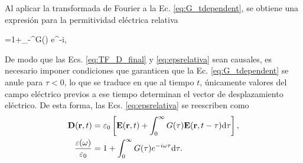 Al aplicar la transformada de Fourier a la Ec. \eqref{eq:G_tdependent}, se obtiene una expresión para la permitividad eléctrica relativa
%
\begin{tcolorbox}
	=1+\int_{-\infty}^{\infty}G(\tau) e^{-i\omega\tau}\tau,
	\label{eq:epsrelativa} 
\end{tcolorbox}
%
De modo que las Ecs. \eqref{eq:TF_D_final} y \eqref{eq:epsrelativa} sean causales, es necesario imponer condiciones que garanticen que la Ec. \eqref{eq:G_tdependent} se anule para $\tau<0$, lo que se traduce en que al tiempo $t$, únicamente valores del campo eléctrico previos a ese tiempo determinan el vector de desplazamiento eléctrico. De esta forma, las Ecs. \eqref{eq:epsrelativa} se reescriben como
%
\begin{align*}
	\vb{D}(\vb{r},t)&=\varepsilon_0\left[\vb{E}(\vb{r},t)+\int_{0}^{\infty}G(\tau)\vb{E}(\vb{r},t-\tau)\text{d}\tau\right],\\ \label{eq:TF_D_final}
	\frac{\varepsilon(\omega)}{\varepsilon_0}&=1+\int_{0}^{\infty}G(\tau) e^{-i\omega\tau}\text{d}\tau.
\end{align*}


















